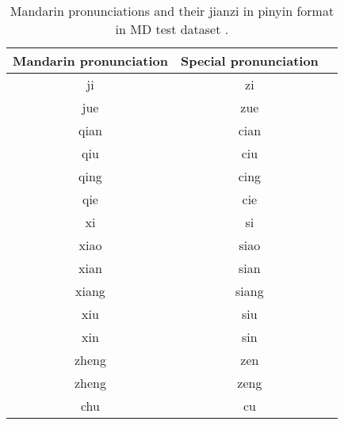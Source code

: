 \begin{table}[H]
\centering
\begin{tabular}{ccc}
\toprule
Mandarin pronunciation & Special pronunciation \\
\midrule
ji                &              zi  \\
jue               &              zue  \\
qian              &              cian \\
qiu               &              ciu  \\
qing              &              cing  \\
qie               &              cie   \\
xi                &              si   \\
xiao              &              siao \\
xian              &              sian \\
xiang             &              siang \\
xiu               &              siu  \\
xin               &              sin  \\
zheng             &              zen  \\
zheng             &              zeng \\
chu               &              cu  \\
\bottomrule
\end{tabular}
\caption{Mandarin pronunciations and their jianzi in pinyin format in MD test dataset .}
\label{tab:app:jianzi}
\end{table}
